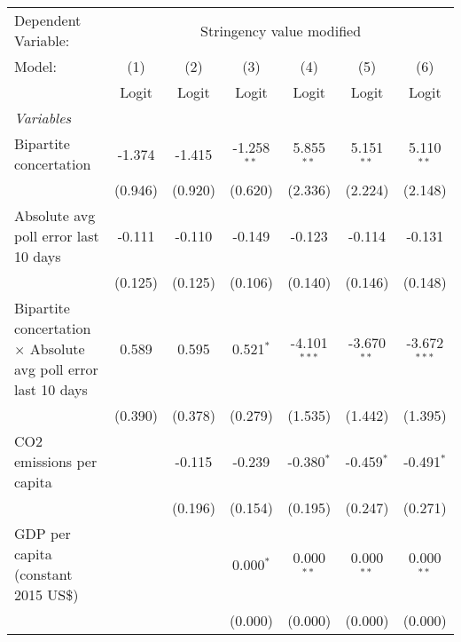 
\begingroup
\centering
\begin{tabular}{lcccccc}
   \toprule
   Dependent Variable: & \multicolumn{6}{c}{Stringency value modified}\\
   Model:                                                                & (1)     & (2)     & (3)           & (4)            & (5)           & (6)\\  
                                                                         &  Logit  & Logit   & Logit         & Logit          & Logit         & Logit\\  
   \midrule
   \emph{Variables}\\
   Bipartite concertation                                                & -1.374  & -1.415  & -1.258$^{**}$ & 5.855$^{**}$   & 5.151$^{**}$  & 5.110$^{**}$\\   
                                                                         & (0.946) & (0.920) & (0.620)       & (2.336)        & (2.224)       & (2.148)\\   
   Absolute avg poll error last 10 days                                  & -0.111  & -0.110  & -0.149        & -0.123         & -0.114        & -0.131\\   
                                                                         & (0.125) & (0.125) & (0.106)       & (0.140)        & (0.146)       & (0.148)\\   
   Bipartite concertation $\times$ Absolute avg poll error last 10 days  & 0.589   & 0.595   & 0.521$^{*}$   & -4.101$^{***}$ & -3.670$^{**}$ & -3.672$^{***}$\\   
                                                                         & (0.390) & (0.378) & (0.279)       & (1.535)        & (1.442)       & (1.395)\\   
   CO2 emissions per capita                                              &         & -0.115  & -0.239        & -0.380$^{*}$   & -0.459$^{*}$  & -0.491$^{*}$\\   
                                                                         &         & (0.196) & (0.154)       & (0.195)        & (0.247)       & (0.271)\\   
   GDP per capita (constant 2015 US\$)                                   &         &         & 0.000$^{*}$   & 0.000$^{**}$   & 0.000$^{**}$  & 0.000$^{**}$\\   
                                                                         &         &         & (0.000)       & (0.000)        & (0.000)       & (0.000)\\   

\end{tabular}

